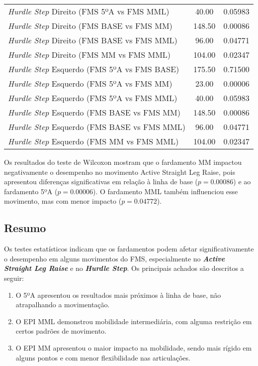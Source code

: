 \begin{table}[H]
\begin{tabular}{lcc}
                \textit{Hurdle Step} Direito (FMS 5ºA vs FMS MML) & 40.00 & 0.05983 \\
                \textit{Hurdle Step} Direito (FMS BASE vs FMS MM) & 148.50 & 0.00086 \\
                \textit{Hurdle Step} Direito (FMS BASE vs FMS MML) & 96.00 & 0.04771 \\
                \textit{Hurdle Step} Direito (FMS MM vs FMS MML) & 104.00 & 0.02347 \\
                \textit{Hurdle Step} Esquerdo (FMS 5ºA vs FMS BASE) & 175.50 & 0.71500 \\
                \textit{Hurdle Step} Esquerdo (FMS 5ºA vs FMS MM) & 23.00 & 0.00006 \\
                \textit{Hurdle Step} Esquerdo (FMS 5ºA vs FMS MML) & 40.00 & 0.05983 \\
                \textit{Hurdle Step} Esquerdo (FMS BASE vs FMS MM) & 148.50 & 0.00086 \\
                \textit{Hurdle Step} Esquerdo (FMS BASE vs FMS MML) & 96.00 & 0.04771 \\
                \textit{Hurdle Step} Esquerdo (FMS MM vs FMS MML) & 104.00 & 0.02347 \\
                \hline
            \end{tabular}
            \end{table}

        Os resultados do teste de Wilcoxon mostram que o fardamento \acrlong{MM} impactou negativamente o desempenho no movimento Active Straight Leg Raise, pois apresentou diferenças significativas em relação à linha de base ($p = 0.00086$) e ao fardamento 5ºA ($p = 0.00006$). O fardamento \acrlong{MML} também influenciou esse movimento, mas com menor impacto ($p = 0.04772$).

    \subsection{Resumo}
        Os testes estatísticos indicam que os fardamentos podem afetar significativamente o desempenho 
        em alguns movimentos do \acrshort{FMS}, especialmente no \textit{\textbf{Active Straight Leg Raise}} e no \textit{\textbf{Hurdle 
        Step}}. Os principais achados são descritos a seguir:
        
        \begin{enumerate}[label=\Roman*.] %
            \item O 5ºA apresentou os resultados mais próximos à linha de base, não atrapalhando a 
            movimentação.
            \item O \acrshort{EPI} \acrlong{MML} demonstrou mobilidade intermediária, com alguma
            restrição em certos padrões de movimento.
            \item O \acrshort{EPI} \acrlong{MM} apresentou o maior impacto na mobilidade, sendo 
            mais rígido em alguns pontos e com menor flexibilidade nas articulações.
            \end{enumerate}

